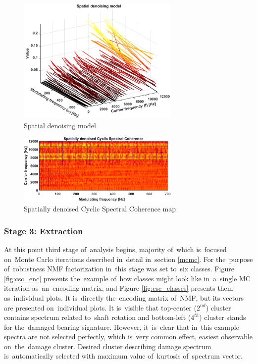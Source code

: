\begin{figure}[ht!]
\centering
\includegraphics[width=0.7\textwidth]{wykresy/csc_spd}
\caption{Spatial denoising model}
\label{fig:csc_spd}
\end{figure}

\begin{figure}[ht!]
\centering
\includegraphics[width=0.7\textwidth]{wykresy/csc_csc3}
\caption{Spatially denoised Cyclic Spectral Coherence map}
\label{fig:csc_csc3}
\end{figure}

\subsubsection{Stage 3: Extraction}

At this point third stage of~analysis begins, majority of~which is~focused on~Monte Carlo iterations described in~detail in~section \ref{mcmc}. For the~purpose of~robustness NMF factorization in~this stage was set to~six classes. Figure \ref{fig:csc_enc} presents the~example of~how classes might look like in~a~single MC iteration as~an~encoding matrix, and Figure \ref{fig:csc_classes} presents them as~individual plots. It is~directly the~encoding matrix of~NMF, but its vectors are presented on~individual plots. It is~visible that top-center ($2^{nd}$) cluster contains spectrum related to~shaft rotation and bottom-left ($4^{th}$) cluster stands for the~damaged bearing signature. However, it~is~clear that in~this example spectra are not selected perfectly, which is~very common effect, easiest observable on~the~damage cluster. Desired cluster describing damage spectrum is~automatically selected with maximum value of~kurtosis of~spectrum vector. 

